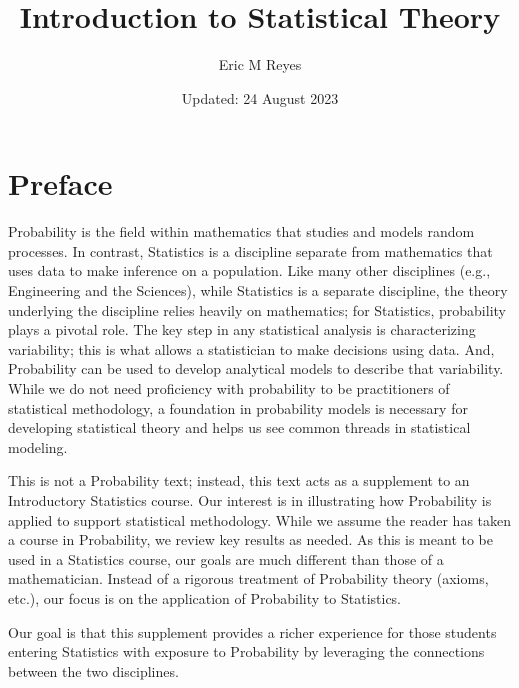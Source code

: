\documentclass[
  letterpaper,
  DIV=11,
  numbers=noendperiod]{scrreprt}
\title{Introduction to Statistical Theory}
\author{Eric M Reyes}
\date{Updated: 24 August 2023}
\renewcommand*\contentsname{Table of contents}
\newcommand\contentsname{Table of contents}
\theoremstyle{definition}
\theoremstyle{definition}
\theoremstyle{plain}
\theoremstyle{remark}
\begin{document}
\maketitle
\ifdefined\Shaded\renewenvironment{Shaded}{\begin{tcolorbox}[sharp corners, borderline west={3pt}{0pt}{shadecolor}, enhanced, frame hidden, interior hidden, breakable, boxrule=0pt]}{\end{tcolorbox}}\fi

\renewcommand*\contentsname{Table of contents}
{
\hypersetup{linkcolor=}
\setcounter{tocdepth}{2}
\tableofcontents
}

\hypertarget{preface}{%
\chapter*{Preface}\label{preface}}


Probability is the field within mathematics that studies and models
random processes. In contrast, Statistics is a discipline separate from
mathematics that uses data to make inference on a population. Like many
other disciplines (e.g., Engineering and the Sciences), while Statistics
is a separate discipline, the theory underlying the discipline relies
heavily on mathematics; for Statistics, probability plays a pivotal
role. The key step in any statistical analysis is characterizing
variability; this is what allows a statistician to make decisions using
data. And, Probability can be used to develop analytical models to
describe that variability. While we do not need proficiency with
probability to be practitioners of statistical methodology, a foundation
in probability models is necessary for developing statistical theory and
helps us see common threads in statistical modeling.

This is not a Probability text; instead, this text acts as a supplement
to an Introductory Statistics course. Our interest is in illustrating
how Probability is applied to support statistical methodology. While we
assume the reader has taken a course in Probability, we review key
results as needed. As this is meant to be used in a Statistics course,
our goals are much different than those of a mathematician. Instead of a
rigorous treatment of Probability theory (axioms, etc.), our focus is on
the application of Probability to Statistics.

Our goal is that this supplement provides a richer experience for those
students entering Statistics with exposure to Probability by leveraging
the connections between the two disciplines.
\end{document}

